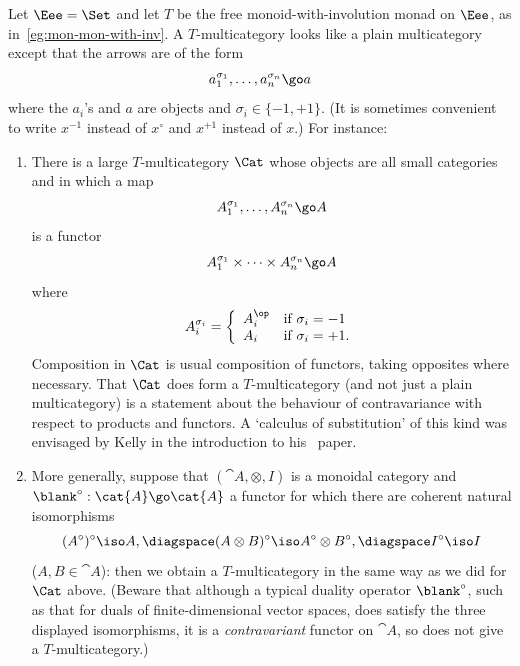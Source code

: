 \begin{example}	
Let $\Eee=\Set$ and let $T$ be the free monoid-with-involution%
%
%
monad on
$\Eee$, as in~\ref{eg:mon-mon-with-inv}.  A $T$-multicategory looks
like a plain multicategory except that the arrows are of the form
\[
a_1^{\sigma_1}, \ldots, a_n^{\sigma_n} \go a
\]
where the $a_i$'s and $a$ are objects and $\sigma_i \in \{-1,+1\}$.  (It is
sometimes convenient to write $x^{-1}$ instead of $x^\circ$ and $x^{+1}$
instead of $x$.)  For instance:
%
\begin{enumerate}
\item {}
There is a large $T$-multicategory $\Cat$%
%
%
whose objects are all
small categories and in which a map
\[
A_1^{\sigma_1}, \ldots, A_n^{\sigma_n} \go A
\]
is a functor 
\[
A_1^{\sigma_1} \times\cdots\times A_n^{\sigma_n} \go A
\]
where 
\[
A_i^{\sigma_i} = 
\left\{
\begin{array}{ll}
A_i^\op	&\textrm{if } \sigma_i = -1	\\
A_i	&\textrm{if } \sigma_i = +1.	\\
\end{array}
\right.
\]
Composition in $\Cat$ is usual composition of functors, taking opposites
where necessary.  That $\Cat$ does form a $T$-multicategory (and not just a
plain multicategory) is a statement about the behaviour of contravariance
with respect to products and functors.  A `calculus of substitution' of
this kind was envisaged by Kelly%
%
%
in the introduction to his~\cite{KelMVFI}
paper. 
% 
\item 	{}
More generally, suppose that $(\cat{A},\otimes,I)$ is a monoidal
category and $\blank^\circ: \cat{A} \go \cat{A}$ a functor for which there
are coherent natural isomorphisms
\[
(A^\circ)^\circ \iso A,
\diagspace
(A \otimes B)^\circ \iso A^\circ \otimes B^\circ,
\diagspace
I^\circ \iso I
\]
($A, B \in \cat{A}$): then we obtain a $T$-multicategory in the same way as
we did for $\Cat$ above.  (Beware that although a typical duality%
%
%
operator
$\blank^\circ$, such as that for duals of finite-dimensional vector spaces,
does satisfy the three displayed isomorphisms, it is a \emph{contravariant}
functor on $\cat{A}$, so does not give a $T$-multicategory.)
\end{enumerate}
%
\end{example}

